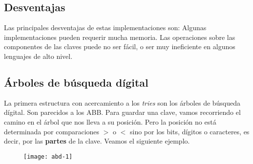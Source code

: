 \documentclass[10pt,a4paper]{article}
\begin{document}
\subsection{Desventajas}

Las principales desventajas de estas implementaciones son:
\newline
\newline
Algunas implementaciones pueden requerir mucha memoria.
\newline
\newline
Las operaciones sobre las componentes de las claves puede no ser fácil, o ser muy ineficiente en algunos lenguajes de alto nivel.

\subsection{Árboles de búsqueda dígital}

La primera estructura con acercamiento a los \textit{tries} son los árboles de búsqueda dígital. 
\newline
\newline
Son parecidos a los ABB. Para guardar una clave, vamos recorriendo el camino en el árbol que nos lleva a su posición.
\newline
\newline
Pero la posición no está determinada por comparaciones $>$ o $<$ sino por los bits, dígitos o caracteres, es decir, por las \textbf{partes} de la clave.
\newpage
Veamos el siguiente ejemplo.

\begin{figure}[h]
	\centering
\texttt{[image: abd-1]}
	\label{drivers1}
\end{figure} 
\end{document}
